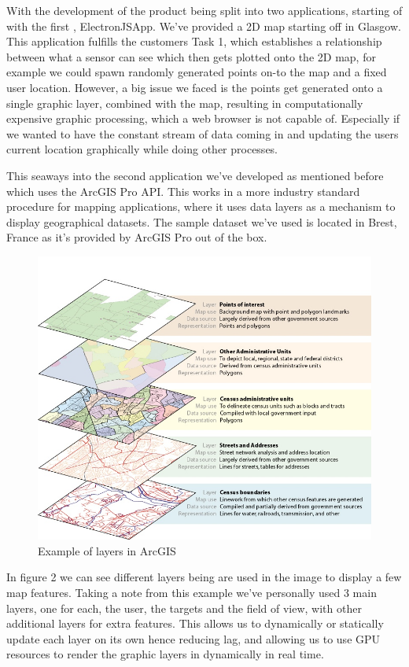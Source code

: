 \documentclass{l3proj}
\begin{document}
With the development of the product being split into two applications, starting of with the first , ElectronJSApp. We've provided a 2D map starting off in Glasgow. This application fulfills the customers Task 1, which establishes a relationship between what a sensor can see which then gets plotted onto the 2D map, for example we could spawn randomly generated points on-to the map and a fixed user location. However, a big issue we faced is the points get generated onto a single graphic layer, combined with the map, resulting in computationally expensive graphic processing, which a web browser is not capable of. Especially if we wanted to have the constant stream of data coming in and updating the users current location graphically while doing other processes. 

This seaways into the second application we've developed as mentioned before which uses the ArcGIS Pro API. This works in a more industry standard procedure for mapping applications, where it uses data layers as a mechanism to display geographical datasets. The sample dataset we've used is located in Brest, France as it's provided by ArcGIS Pro out of the box.

\begin{figure}[h]
    \caption{Example of layers in ArcGIS}
    \centering
    \includegraphics[width=\textwidth]{GISLayers.jpg}
\end{figure}

In figure 2 we can see different layers being are used in the image to display a few map features. Taking a note from this example we've personally used 3 main layers, one for each, the user, the targets and the field of view, with other additional layers for extra features. This allows us to dynamically or statically update each layer on its own hence reducing lag, and allowing us to use GPU resources to render the graphic layers in dynamically in real time. 
\end{document}
